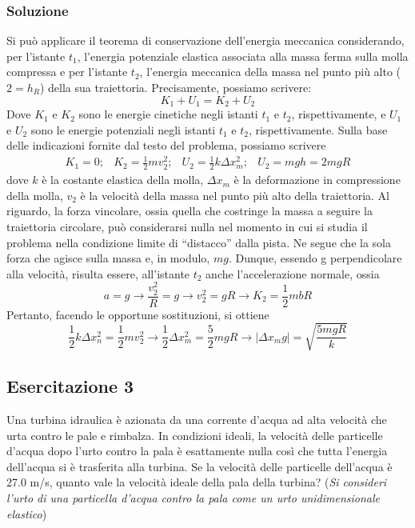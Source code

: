 \documentclass{book}
\begin{document}
\subsubsection{Soluzione}
Si può applicare il teorema di conservazione dell’energia meccanica considerando, per l’istante $t_1$, l’energia potenziale elastica associata alla massa ferma sulla molla compressa e per l’istante  $t_2$, l’energia  meccanica  della  massa  nel  punto  più  alto  ($2=h_R$)  della  sua  traiettoria.  Precisamente, possiamo scrivere:
\begin{equation*}
	K_1+U_1=K_2+U_2
\end{equation*}
Dove  $K_1$  e  $K_2$  sono le energie cinetiche negli istanti  $t_1$  e  $t_2$, rispettivamente, e  $U_1$  e  $U_2$  sono le energie potenziali negli istanti $t_1$ e $t_2$, rispettivamente. Sulla base delle indicazioni fornite dal testo del problema, possiamo scrivere
\begin{equation*}
	\begin{matrix}
		K_1=0;&K_2=\frac{1}{2}mv_2^2;&U_2=\frac{1}{2}k\Delta x_m^2;&U_2=mgh=2mgR
	\end{matrix}
\end{equation*}
dove $k$ è la costante elastica della molla, $\Delta x_m$ è la deformazione in compressione della molla, $v_2$ è la velocità della massa nel punto più alto della traiettoria. Al riguardo, la forza vincolare, ossia quella che costringe la massa a seguire la traiettoria circolare, può considerarsi nulla nel momento in cui si studia il problema nella condizione limite di ``distacco'' dalla pista. Ne segue che la sola forza che agisce sulla massa e, in modulo, $mg$. Dunque, essendo g perpendicolare alla velocità, risulta essere, all’istante $t_2$ anche l’accelerazione normale, ossia
\begin{equation*}
	a=g \to \frac{v_2^2}{R}=g\to v_2^2=gR\to K_2=\frac{1}{2}mbR
\end{equation*}
Pertanto, facendo le opportune sostituzioni, si ottiene
\begin{equation*}
	\frac{1}{2}k\Delta x_n^2=\frac{1}{2}mv_2^2\to \frac{1}{2}\Delta x_m^2=\frac{5}{2}mgR\to|\Delta x_mg|=\sqrt{\frac{5mgR}{k}}
\end{equation*}
\subsection{Esercitazione 3}
Una turbina idraulica è azionata da una corrente d'acqua ad alta velocità che urta contro le pale e rimbalza.   In   condizioni   ideali,   la   velocità   delle   particelle   d'acqua   dopo   l'urto   contro   la   pala   è esattamente nulla così che tutta l'energia dell'acqua si è trasferita alla turbina. Se la velocità delle particelle dell'acqua è 27.0 m/s, quanto vale la velocità ideale della pala della turbina? (\textit{Si consideri l'urto di una particella d'acqua contro la pala come un urto unidimensionale elastico})
\end{document}
